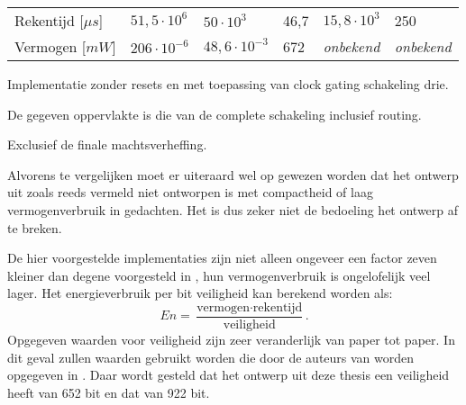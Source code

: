\begin{table}[h]
\begin{narrow}{-2cm}{-2cm}
\begin{tabular}{llllll}
			Rekentijd [$\mu s$]															& $51,5 \cdot 10^6$			& $50 \cdot 10^3$				& 46,7						& $15,8 \cdot 10^3$			& 250\footnotemark[4]\\
			Vermogen [$mW$]																& $206 \cdot 10^{-6}$		& $48,6 \cdot 10^{-3}$		& 672							& \emph{onbekend}				& \emph{onbekend}\\
			\bottomrule		
		\end{tabular}
	\end{narrow}
	
	\footnotesize \footnotemark[2] Implementatie zonder resets en met toepassing van clock gating schakeling drie.
	
	\footnotemark[3] De gegeven oppervlakte is die van de complete schakeling inclusief routing.
	
	\footnotemark[4] Exclusief de finale machtsverheffing.
	
\end{table}

Alvorens te vergelijken moet er uiteraard wel op gewezen worden dat het ontwerp uit \cite{beuchat-asic} zoals reeds vermeld niet ontworpen is met compactheid of laag vermogenverbruik in gedachten. Het is dus zeker niet de bedoeling het ontwerp af te breken. 

De hier voorgestelde implementaties zijn niet alleen ongeveer een factor zeven kleiner dan degene voorgesteld in \cite{beuchat-asic}, hun vermogenverbruik is ongelofelijk veel lager. Het energieverbruik per bit veiligheid kan berekend worden als:
\[En = \frac{\text{vermogen} \cdot \text{rekentijd}}{\text{veiligheid}}.\]
Opgegeven waarden voor veiligheid zijn zeer veranderlijk van paper tot paper. In dit geval zullen waarden gebruikt worden die door de auteurs van \cite{beuchat-asic} worden opgegeven in \cite{beuchat}. Daar wordt gesteld dat het ontwerp uit deze thesis een veiligheid heeft van 652 bit en dat van \cite{beuchat-asic} 922 bit.

